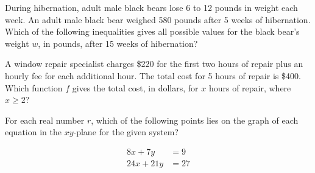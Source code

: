 \vspace{2em}

\noindent\markforreview
\vspace{1em}

During hibernation, adult male black bears lose 6 to 12 pounds in weight each week. An adult male black bear weighed 580 pounds after 5 weeks of hibernation. Which of the following inequalities gives all possible values for the black bear's weight $w$, in pounds, after 15 weeks of hibernation?

\vspace{0.75em}


\vspace{2em}

\noindent\markforreview
\vspace{1em}

A window repair specialist charges \$220 for the first two hours of repair plus an hourly fee for each additional hour. The total cost for 5 hours of repair is \$400. Which function $f$ gives the total cost, in dollars, for $x$ hours of repair, where $x \geq 2$?

\vspace{0.75em}


\vspace{2em}

\noindent\markforreview
\vspace{1em}

For each real number $r$, which of the following points lies on the graph of each equation in the $xy$-plane for the given system?

\vspace{0.5em}

\[
\begin{aligned}
8x + 7y &= 9 \\
24x + 21y &= 27
\end{aligned}
\]

\vspace{0.75em}

